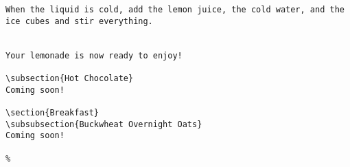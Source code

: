 \begin{verbatim}
When the liquid is cold, add the lemon juice, the cold water, and the ice cubes and stir everything. 
	
	
Your lemonade is now ready to enjoy!
	
\subsection{Hot Chocolate}
Coming soon!
	
\section{Breakfast}
\subsubsection{Buckwheat Overnight Oats}
Coming soon!
	
% 
\end{verbatim}